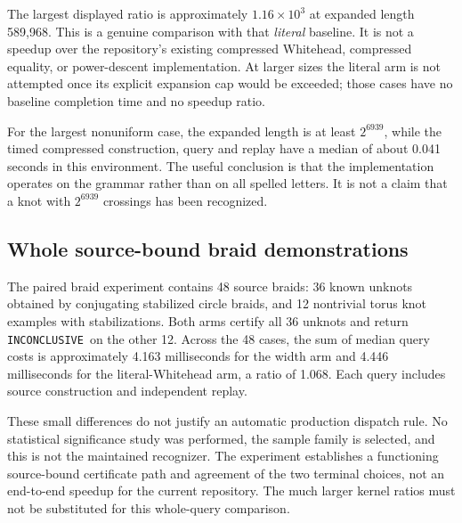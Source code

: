\documentclass[11pt,letterpaper]{article}
\theoremstyle{definition}
\newcommand{\INC}{\texttt{INCONCLUSIVE}}
\begin{document}
\begin{table}[ht]
\centering\small

\caption{Paired kernel medians, including construction and independent replay
in the width arm. The baseline is literal, not the maintained compressed engine.}
\label{tab:kernel}
\end{table}

The largest displayed ratio is approximately $1.16\times10^3$ at expanded
length 589,968. This is a genuine comparison with that \emph{literal}
baseline. It is not a speedup over the repository's existing compressed
Whitehead, compressed equality, or power-descent implementation. At larger
sizes the literal arm is not attempted once its explicit expansion cap would
be exceeded; those cases have no baseline completion time and no speedup
ratio.

\begin{table}[ht]
\centering\small

\caption{Nonuniform compressed inputs beyond the literal expansion allowance.
Construction is included; no speedup ratio is assigned to an unrun baseline.}
\label{tab:large}
\end{table}

For the largest nonuniform case, the expanded length is at least $2^{6939}$,
while the timed compressed construction, query and replay have a median of
about 0.041 seconds in this environment. The useful conclusion is that the
implementation operates on the grammar rather than on all spelled letters.
It is not a claim that a knot with $2^{6939}$ crossings has been recognized.

\subsection{Whole source-bound braid demonstrations}
The paired braid experiment contains 48 source braids: 36 known unknots
obtained by conjugating stabilized circle braids, and 12 nontrivial torus
knot examples with stabilizations. Both arms certify all 36 unknots and
return \INC\ on the other 12. Across the 48 cases, the sum of median query
costs is approximately 4.163 milliseconds for the width arm and 4.446
milliseconds for the literal-Whitehead arm, a ratio of 1.068. Each query
includes source construction and independent replay.

These small differences do not justify an automatic production dispatch
rule. No statistical significance study was performed, the sample family
is selected, and this is not the maintained recognizer. The experiment
establishes a functioning source-bound certificate path and agreement of the
two terminal choices, not an end-to-end speedup for the current repository.
The much larger kernel ratios must not be substituted for this whole-query
comparison.
\end{document}
